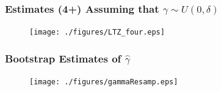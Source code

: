 \documentclass[9pt,letterpaper,subeqn]{beamer}
\begin{document}
\begin{frame}[label=four]
\frametitle{Estimates (4+) Assuming that $\gamma \sim U(0,\delta)$}
\begin{figure}[htpb!]
\centering
  \texttt{[image: ./figures/LTZ\_four.eps]}
\end{figure}
\hyperlink{Conley}{}
\end{frame}

\begin{frame}[label=gammaResamp]
  \frametitle{Bootstrap Estimates of $\hat\gamma$}
  \begin{figure}[htpb!]
    \centering
    \texttt{[image: ./figures/gammaResamp.eps]}
  \end{figure}
  \hyperlink{gammaDiscuss}{}
  \end{frame}
\end{document}

